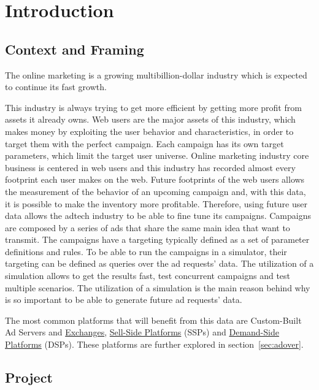 \chapter{Introduction} \label{chap:intro}


\section{Context and Framing} \label{sec:context}

The online marketing is a growing multibillion-dollar industry \cite{PricewaterhouseCoopers2013}
which is expected to continue its fast growth\cite{PricewaterhouseCoopers2013a}.

This industry is always trying to get more efficient by getting more profit from
assets it already owns. 
Web users are the major assets of this industry, which makes money by exploiting the user behavior and characteristics, in order to target them with the
perfect campaign. Each campaign has its own target parameters, which limit the target user universe.
Online marketing industry core business is centered in web users and this industry has recorded almost every footprint each user makes on the web.
Future footprints of the web users allows the measurement of the behavior of an
upcoming campaign and, with this data, it is possible to make the inventory more
profitable. Therefore, using future user data allows the adtech industry to be able to fine tune its campaigns. 
Campaigns are composed by a series of ads that share the same main idea that
want to transmit. The campaigns have a targeting typically defined as a set of
parameter definitions and rules. To be able to run the campaigns in a
simulator, their targeting can be defined as
queries over the ad requests' data. The utilization of a simulation allows to
get the results fast, test concurrent campaigns and test multiple scenarios.
The utilization of a simulation is the main reason behind
why is so important to be able to generate future ad requests' data.

The most common platforms that will benefit from this data are Custom-Built Ad
Servers and \hyperref[itm:adex]{Exchanges}, \hyperref[itm:ssp]{Sell-Side Platforms} (SSPs) and
\hyperref[itm:dsp]{Demand-Side Platforms}
(DSPs). These platforms are further explored in section~\ref{sec:adover}.


\section{Project} \label{sec:proj}

